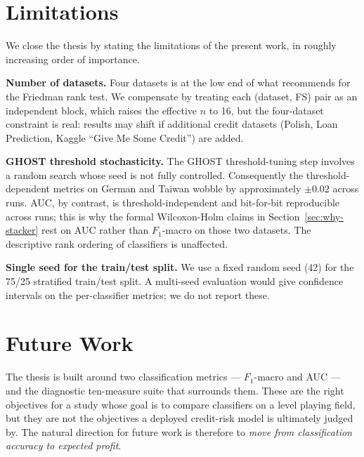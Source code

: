 \section{Limitations}
\label{sec:limitations}

We close the thesis by stating the limitations of the present
work, in roughly increasing order of importance.

\textbf{Number of datasets.} Four datasets is at the low end of
what \citet{demvsar2006statistical} recommends for the Friedman
rank test.  We compensate by treating each (dataset, FS) pair as
an independent block, which raises the effective $n$ to 16, but
the four-dataset constraint is real: results may shift if
additional credit datasets (Polish, Loan Prediction, Kaggle
``Give Me Some Credit'') are added.

\textbf{GHOST threshold stochasticity.}  The GHOST threshold-tuning
step involves a random search whose seed is not fully controlled.
Consequently the threshold-dependent metrics on German and Taiwan
wobble by approximately $\pm 0.02$ across runs.  AUC, by contrast,
is threshold-independent and bit-for-bit reproducible across runs;
this is why the formal Wilcoxon-Holm claims in
Section~\ref{sec:why-stacker} rest on AUC rather than $F_1$-macro
on those two datasets.  The descriptive rank ordering of
classifiers is unaffected.

\textbf{Single seed for the train/test split.} We use a fixed
random seed (42) for the 75/25 stratified train/test split.  A
multi-seed evaluation would give confidence intervals on the
per-classifier metrics; we do not report these.

\section{Future Work}
\label{sec:future}

The thesis is built around two classification metrics ---
$F_1$-macro and AUC --- and the diagnostic ten-measure suite that
surrounds them.  These are the right objectives for a study whose
goal is to compare classifiers on a level playing field, but they
are not the objectives a deployed credit-risk model is ultimately
judged by.  The natural direction for future work is therefore to
\emph{move from classification accuracy to expected profit}.

